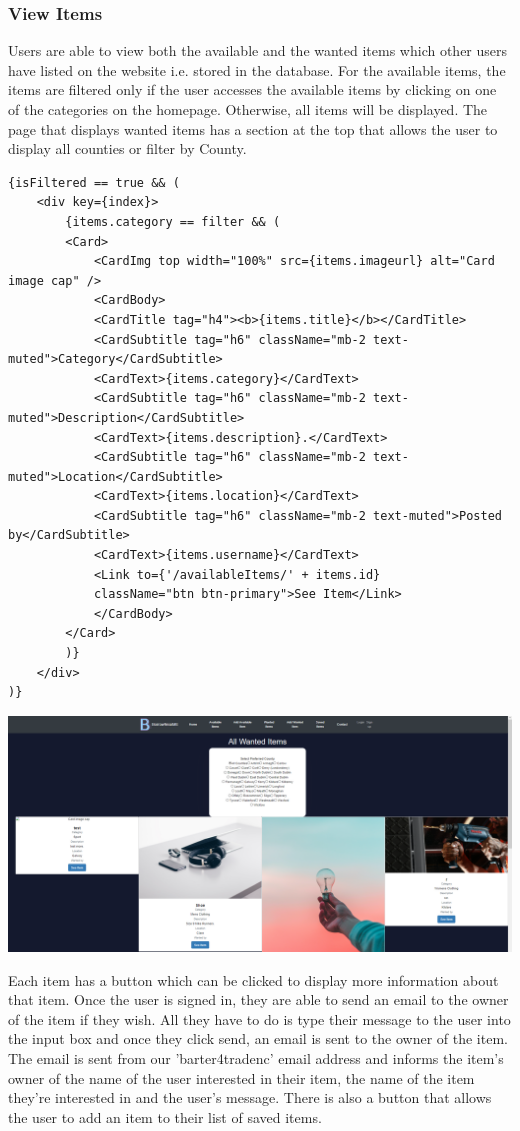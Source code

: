 \subsubsection{View Items}
Users are able to view both the available and the wanted items which other users have listed on the website i.e. stored in the database. For the available items, the items are filtered only if the user accesses the available items by clicking on one of the categories on the homepage. Otherwise, all items will be displayed. The page that displays wanted items has a section at the top that allows the user to display all counties or filter by County.
\begin{verbatim}
{isFiltered == true && (
    <div key={index}>
        {items.category == filter && (
        <Card>
            <CardImg top width="100%" src={items.imageurl} alt="Card image cap" />
            <CardBody>
            <CardTitle tag="h4"><b>{items.title}</b></CardTitle>
            <CardSubtitle tag="h6" className="mb-2 text-muted">Category</CardSubtitle>
            <CardText>{items.category}</CardText>
            <CardSubtitle tag="h6" className="mb-2 text-muted">Description</CardSubtitle>
            <CardText>{items.description}.</CardText>
            <CardSubtitle tag="h6" className="mb-2 text-muted">Location</CardSubtitle>
            <CardText>{items.location}</CardText>
            <CardSubtitle tag="h6" className="mb-2 text-muted">Posted by</CardSubtitle>
            <CardText>{items.username}</CardText>
            <Link to={'/availableItems/' + items.id}
            className="btn btn-primary">See Item</Link>
            </CardBody>
        </Card>
        )}
    </div>
)}
\end{verbatim}
\includegraphics[width=\textwidth]{img/fe_wanteditems.PNG}
\par
Each item has a button which can be clicked to display more information about that item. Once the user is signed in, they are able to send an email to the owner of the item if they wish. All they have to do is type their message to the user into the input box and once they click send, an email is sent to the owner of the item. The email is sent from our 'barter4tradenc' email address and informs the item's owner of the name of the user interested in their item, the name of the item they're interested in and the user's message. There is also a button that allows the user to add an item to their list of saved items.
